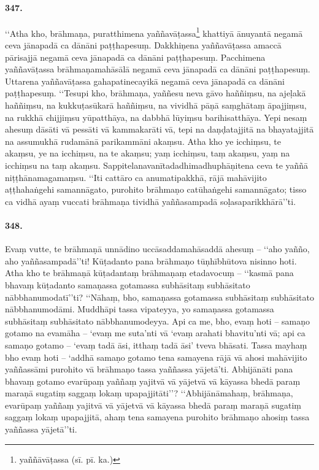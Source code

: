 \paragraph{347.} ‘‘Atha kho, brāhmaṇa, puratthimena yaññavāṭassa\footnote{yaññāvāṭassa (sī. pī. ka.)} khattiyā ānuyantā negamā ceva jānapadā ca dānāni paṭṭhapesuṃ. Dakkhiṇena yaññavāṭassa amaccā pārisajjā negamā ceva jānapadā ca dānāni paṭṭhapesuṃ. Pacchimena yaññavāṭassa brāhmaṇamahāsālā negamā ceva jānapadā ca dānāni paṭṭhapesuṃ. Uttarena yaññavāṭassa gahapatinecayikā negamā ceva jānapadā ca dānāni paṭṭhapesuṃ. ‘‘Tesupi kho, brāhmaṇa, yaññesu neva gāvo haññiṃsu, na ajeḷakā haññiṃsu, na kukkuṭasūkarā haññiṃsu, na vividhā pāṇā saṃghātaṃ āpajjiṃsu, na rukkhā chijjiṃsu yūpatthāya, na dabbhā lūyiṃsu barihisatthāya. Yepi nesaṃ ahesuṃ dāsāti vā pessāti vā kammakarāti vā, tepi na daṇḍatajjitā na bhayatajjitā na assumukhā rudamānā parikammāni akaṃsu. Atha kho ye icchiṃsu, te akaṃsu, ye na icchiṃsu, na te akaṃsu; yaṃ icchiṃsu, taṃ akaṃsu, yaṃ na icchiṃsu na taṃ akaṃsu. Sappitelanavanītadadhimadhuphāṇitena ceva te yaññā niṭṭhānamagamaṃsu. ‘‘Iti cattāro ca anumatipakkhā, rājā mahāvijito aṭṭhahaṅgehi samannāgato, purohito brāhmaṇo catūhaṅgehi samannāgato; tisso ca vidhā ayaṃ vuccati brāhmaṇa tividhā yaññasampadā soḷasaparikkhārā’’ti.

\paragraph{348.} Evaṃ vutte, te brāhmaṇā unnādino uccāsaddamahāsaddā ahesuṃ – ‘‘aho yañño, aho yaññasampadā’’ti! Kūṭadanto pana brāhmaṇo tūṇhībhūtova nisinno hoti. Atha kho te brāhmaṇā kūṭadantaṃ brāhmaṇaṃ etadavocuṃ – ‘‘kasmā pana bhavaṃ kūṭadanto samaṇassa gotamassa subhāsitaṃ subhāsitato nābbhanumodatī’’ti? ‘‘Nāhaṃ, bho, samaṇassa gotamassa subhāsitaṃ subhāsitato nābbhanumodāmi. Muddhāpi tassa vipateyya, yo samaṇassa gotamassa subhāsitaṃ subhāsitato nābbhanumodeyya. Api ca me, bho, evaṃ hoti – samaṇo gotamo na evamāha – ‘evaṃ me suta’nti vā ‘evaṃ arahati bhavitu’nti vā; api ca samaṇo gotamo – ‘evaṃ tadā āsi, itthaṃ tadā āsi’ tveva bhāsati. Tassa mayhaṃ bho evaṃ hoti – ‘addhā samaṇo gotamo tena samayena rājā vā ahosi mahāvijito yaññassāmi purohito vā brāhmaṇo tassa yaññassa yājetā’ti. Abhijānāti pana bhavaṃ gotamo evarūpaṃ yaññaṃ yajitvā vā yājetvā vā kāyassa bhedā paraṃ maraṇā sugatiṃ saggaṃ lokaṃ upapajjitāti’’? ‘‘Abhijānāmahaṃ, brāhmaṇa, evarūpaṃ yaññaṃ yajitvā vā yājetvā vā kāyassa bhedā paraṃ maraṇā sugatiṃ saggaṃ lokaṃ upapajjitā, ahaṃ tena samayena purohito brāhmaṇo ahosiṃ tassa yaññassa yājetā’’ti.

